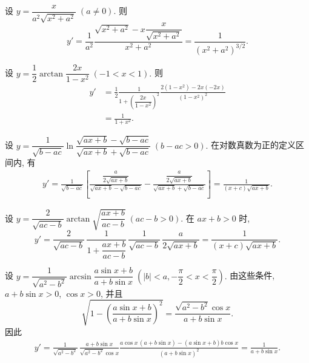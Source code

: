 \label{ex:differentiate_x_over_radical}
设
$
y=\dfrac{x}{a^2\sqrt{x^2+a^2}}\; (a\ne0).
$
则
$$
y'=\frac1{a^2}
\frac{\sqrt{x^2+a^2}-x\dfrac{x}{\sqrt{x^2+a^2}}}{x^2+a^2}
=\frac1{(x^2+a^2)^{3/2}}.
$$

\label{ex:differentiate_half_arctangent}
设
$
y=\dfrac12\arctan\dfrac{2x}{1-x^2}\; (-1<x<1).
$
则
$$
\begin{aligned}
y'&=\frac12\frac1{1+\left(\dfrac{2x}{1-x^2}\right)^2}
\frac{2(1-x^2)-2x(-2x)}{(1-x^2)^2}\\
&=\frac1{1+x^2}.
\end{aligned}
$$

\par\endgroup
\newpage

\begingroup
\setlength{\abovedisplayskip}{4pt plus 1pt minus 1pt}
\setlength{\belowdisplayskip}{4pt plus 1pt minus 1pt}
\setlength{\abovedisplayshortskip}{1.5pt plus 1pt}
\setlength{\belowdisplayshortskip}{4pt plus 1pt minus 1pt}
\setlength{\jot}{2pt}

\label{ex:differentiate_log_radical_form}
设
$
y=\dfrac1{\sqrt{b-ac}}
\ln\dfrac{\sqrt{ax+b}-\sqrt{b-ac}}{\sqrt{ax+b}+\sqrt{b-ac}}\;
(b-ac>0).
$
在对数真数为正的定义区间内, 有
\begin{align*}
y'=\frac1{\sqrt{b-ac}}\left[
\frac{\dfrac{a}{2\sqrt{ax+b}}}{\sqrt{ax+b}-\sqrt{b-ac}}
-\frac{\dfrac{a}{2\sqrt{ax+b}}}{\sqrt{ax+b}+\sqrt{b-ac}}
\right]
=\frac1{(x+c)\sqrt{ax+b}}.
\end{align*}

\label{ex:differentiate_arctangent_radical_form}
设
$
y=\dfrac2{\sqrt{ac-b}}\arctan\sqrt{\dfrac{ax+b}{ac-b}}\; (ac-b>0).
$
在 $ax+b>0$ 时,
$$
y'=\frac2{\sqrt{ac-b}}\,
\frac1{1+\dfrac{ax+b}{ac-b}}\,
\frac1{\sqrt{ac-b}}\,
\frac{a}{2\sqrt{ax+b}}
=\frac1{(x+c)\sqrt{ax+b}}.
$$

\label{ex:differentiate_arcsine_fractional_sine}
设
$
y=\dfrac1{\sqrt{a^2-b^2}}\arcsin\dfrac{a\sin x+b}{a+b\sin x}\;
(|b|<a, -\dfrac\pi2<x<\dfrac\pi2).
$
由这些条件, $a+b\sin x>0$, $\cos x>0$, 并且
$$
\sqrt{1-\left(\dfrac{a\sin x+b}{a+b\sin x}\right)^2}
=\dfrac{\sqrt{a^2-b^2}\cos x}{a+b\sin x}.
$$
因此
\begin{align*}
y'=\frac1{\sqrt{a^2-b^2}}\,
\frac{a+b\sin x}{\sqrt{a^2-b^2}\cos x}
\frac{a\cos x\,(a+b\sin x)-(a\sin x+b)b\cos x}
{(a+b\sin x)^2}=\frac1{a+b\sin x}.
\end{align*}

